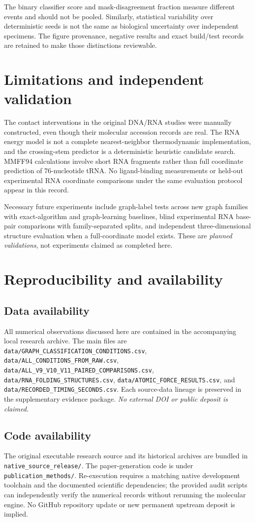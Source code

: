 \documentclass[10pt,a4paper]{article}
\begin{document}
The binary classifier score and mask-disagreement fraction measure different events and should not be pooled. Similarly, statistical variability over deterministic seeds is not the same as biological uncertainty over independent specimens. The figure provenance, negative results and exact build/test records are retained to make those distinctions reviewable.

\section{Limitations and independent validation}
The contact interventions in the original DNA/RNA studies were manually constructed, even though their molecular accession records are real. The RNA energy model is not a complete nearest-neighbor thermodynamic implementation, and the crossing-stem predictor is a deterministic heuristic candidate search. MMFF94 calculations involve short RNA fragments rather than full coordinate prediction of 76-nucleotide tRNA. No ligand-binding measurements or held-out experimental RNA coordinate comparisons under the same evaluation protocol appear in this record.

Necessary future experiments include graph-label tests across new graph families with exact-algorithm and graph-learning baselines, blind experimental RNA base-pair comparisons with family-separated splits, and independent three-dimensional structure evaluation when a full-coordinate model exists. These are \emph{planned validations}, not experiments claimed as completed here.

\section{Reproducibility and availability}\subsection{Data availability}
All numerical observations discussed here are contained in the accompanying local research archive. The main files are \texttt{data/GRAPH\_CLASSIFICATION\_CONDITIONS.csv}, \texttt{data/ALL\_CONDITIONS\_FROM\_RAW.csv}, \texttt{data/ALL\_V9\_V10\_V11\_PAIRED\_COMPARISONS.csv}, \texttt{data/RNA\_FOLDING\_STRUCTURES.csv}, \texttt{data/ATOMIC\_FORCE\_RESULTS.csv}, and \texttt{data/RECORDED\_TIMING\_SECONDS.csv}. Each source-data lineage is preserved in the supplementary evidence package. \emph{No external DOI or public deposit is claimed.}
\subsection{Code availability}
The original executable research source and its historical archives are bundled in \texttt{native\_source\_release/}. The paper-generation code is under \texttt{publication\_methods/}. Re-execution requires a matching native development toolchain and the documented scientific dependencies; the provided audit scripts can independently verify the numerical records without rerunning the molecular engine. No GitHub repository update or new permanent upstream deposit is implied.
\end{document}
